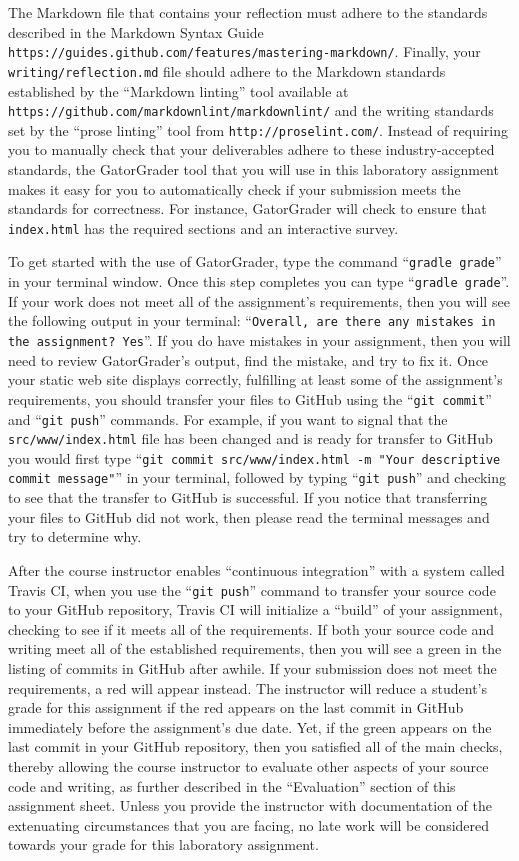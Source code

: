 \documentclass[11pt]{article}
\newcommand{\mainprogram}{\lstinline{index.html}}
\newcommand{\mainprogramsource}{\lstinline{src/www/index.html}}
\newcommand{\reflection}{\lstinline{writing/reflection.md}}
\newcommand{\gatorgraderstart}{\command{gradle grade}}
\newcommand{\gatorgradercheck}{\command{gradle grade}}
\newcommand{\gitcommit}{\command{git commit}}
\newcommand{\gitpush}{\command{git push}}
\newcommand{\gitcommitmainprogram}{\command{git commit src/www/index.html -m "Your
descriptive commit message"}}
\newcommand{\command}[1]{``\lstinline{#1}''}
\newcommand{\url}[1]{\lstinline{#1}}
\newcommand{\step}[1]{``{#1}''}
\newcommand{\checkmark}{\ding{51}}
\newcommand{\naughtmark}{\ding{55}}
\begin{document}
The Markdown file that contains your reflection must adhere to the standards
described in the Markdown Syntax Guide
\url{https://guides.github.com/features/mastering-markdown/}. Finally, your
\reflection{} file should adhere to the Markdown standards established by the
\step{Markdown linting} tool available at
\url{https://github.com/markdownlint/markdownlint/} and the writing standards
set by the \step{prose linting} tool from \url{http://proselint.com/}. Instead
of requiring you to manually check that your deliverables adhere to these
industry-accepted standards, the GatorGrader tool that you will use in this
laboratory assignment makes it easy for you to automatically check if your
submission meets the standards for correctness. For instance, GatorGrader will
check to ensure that \mainprogram{} has the required sections and an
interactive survey.

To get started with the use of GatorGrader, type the command \gatorgraderstart{}
in your terminal window. Once this step completes you can type
\gatorgradercheck{}. If your work does not meet all of the assignment's
requirements, then you will see the following output in your terminal:
\command{Overall, are there any mistakes in the assignment? Yes}. If you do have
mistakes in your assignment, then you will need to review GatorGrader's output,
find the mistake, and try to fix it. Once your static web site displays
correctly, fulfilling at least some of the assignment's requirements, you should
transfer your files to GitHub using the \gitcommit{} and \gitpush{} commands.
For example, if you want to signal that the \mainprogramsource{} file has been
changed and is ready for transfer to GitHub you would first type
\gitcommitmainprogram{} in your terminal, followed by typing \gitpush{} and
checking to see that the transfer to GitHub is successful. If you notice that
transferring your files to GitHub did not work, then please read the terminal
messages and try to determine why.

After the course instructor enables \step{continuous integration} with a system
called Travis CI, when you use the \gitpush{} command to transfer your source
code to your GitHub repository, Travis CI will initialize a \step{build} of your
assignment, checking to see if it meets all of the requirements. If both your
source code and writing meet all of the established requirements, then you will
see a green \checkmark{} in the listing of commits in GitHub after awhile. If
your submission does not meet the requirements, a red \naughtmark{} will appear
instead. The instructor will reduce a student's grade for this assignment if the
red \naughtmark{} appears on the last commit in GitHub immediately before the
assignment's due date. Yet, if the green \checkmark{} appears on the last commit
in your GitHub repository, then you satisfied all of the main checks, thereby
allowing the course instructor to evaluate other aspects of your source code and
writing, as further described in the \step{Evaluation} section of this
assignment sheet. Unless you provide the instructor with documentation of the
extenuating circumstances that you are facing, no late work will be considered
towards your grade for this laboratory assignment.
\end{document}
